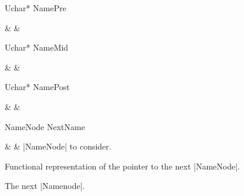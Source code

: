 \begin{Macro}{Uchar* }{NamePre}
  \begin{Arguments}
    &  & \\
  \end{Arguments}%
  
  
  
  \begin{Result}
    
  \end{Result}
\end{Macro}
\begin{Macro}{Uchar* }{NameMid}
  \begin{Arguments}
    &  & \\
  \end{Arguments}%
  
  
  
  \begin{Result}
    
  \end{Result}
\end{Macro}
\begin{Macro}{Uchar* }{NamePost}
  \begin{Arguments}
    &  & \\
  \end{Arguments}%
  
  
  
  \begin{Result}
    
  \end{Result}
\end{Macro}
\begin{Macro}{NameNode }{NextName}
  \begin{Arguments}
    &  & |NameNode| to consider.\\
  \end{Arguments}%
  Functional representation of the pointer to the next
  |NameNode|.
  \begin{Result}
    The next |Namenode|.
  \end{Result}
\end{Macro}


